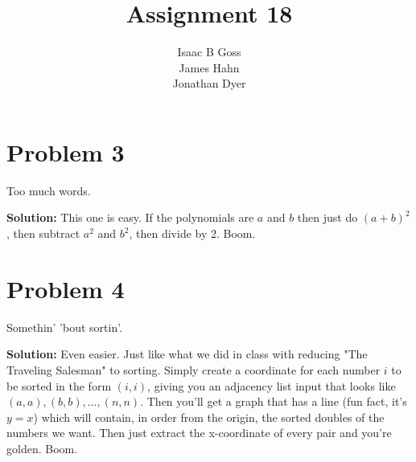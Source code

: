 \documentclass{article}
\author{Isaac B Goss\\ James Hahn\\ Jonathan Dyer}
\title{Assignment 18}
\providecommand{\prob}[1]{\section*{Problem #1}}
\providecommand{\soln}{\textbf{Solution: }}
\begin{document}
\maketitle
\prob{3}
Too much words.\par
\soln
This one is easy. If the polynomials are $a$ and $b$ then just do $\left(a+b\right)^2$, then subtract $a^2$ and $b^2$, then divide by 2. Boom.

\prob{4}
Somethin' 'bout sortin'.\par
\soln
Even easier. Just like what we did in class with reducing "The Traveling Salesman" to sorting. Simply create a coordinate for each number $i$ to be sorted in the form $\left(i,i\right)$, giving you an adjacency list input that looks like $\left(a,a\right),\left(b,b\right), \dots, \left(n,n\right)$. Then you'll get a graph that has a line (fun fact, it's $y=x$) which will contain, in order from the origin, the sorted doubles of the numbers we want. Then just extract the x-coordinate of every pair and you're golden. Boom.
\end{document}
